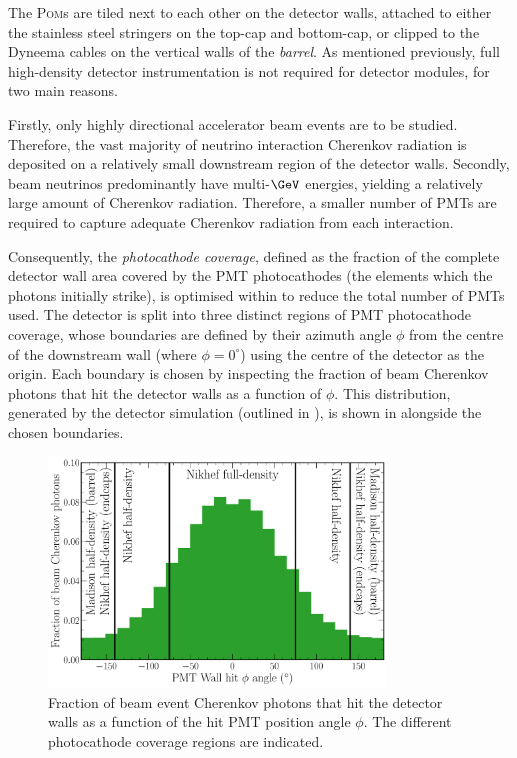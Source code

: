 The \textsc{Pom}s are tiled next to each other on the detector walls, attached to either the
stainless steel stringers on the top-cap and bottom-cap, or clipped to the Dyneema cables on the
vertical walls of the \emph{barrel}. As mentioned previously, full high-density detector
instrumentation is not required for \chips detector modules, for two main reasons.

Firstly, only highly directional accelerator beam events are to be studied. Therefore, the vast
majority of neutrino interaction Cherenkov radiation is deposited on a relatively small downstream
region of the detector walls. Secondly, beam neutrinos predominantly have multi-$\GeV$ energies,
yielding a relatively large amount of Cherenkov radiation. Therefore, a smaller number of PMTs are
required to capture adequate Cherenkov radiation from each interaction.

Consequently, the \emph{photocathode coverage}, defined as the fraction of the complete detector
wall area covered by the PMT photocathodes (the elements which the photons initially strike), is
optimised within \chipsfive to reduce the total number of PMTs used. The detector is split into
three distinct regions of PMT photocathode coverage, whose boundaries are defined by their azimuth
angle $\phi$ from the centre of the downstream wall (where $\phi=0^{\circ}$) using the centre of
the detector as the origin. Each boundary is chosen by inspecting the fraction of beam Cherenkov
photons that hit the detector walls as a function of $\phi$. This distribution, generated by the
detector simulation (outlined in ), is shown in
 alongside the chosen boundaries.

\begin{figure} %
    \includegraphics[width=0.8\textwidth]{diagrams/4-chips/coverage.pdf}
    \caption[Fraction of beam event Cherenkov photons that hit the detector walls as a function of
        the hit PMT position angle] {Fraction of beam event Cherenkov photons that hit the
        detector walls as a function of the hit PMT position angle $\phi$. The different
        photocathode coverage regions are indicated.}
    \label{fig:coverage}
\end{figure}

